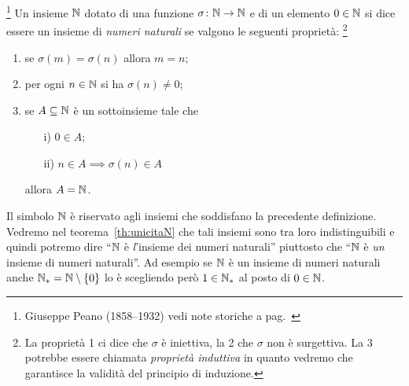 \begin{definition}%
  \footnote{Giuseppe Peano (1858--1932) vedi note storiche a pag.~\pageref{note:Peano}} 
    \label{def:naturali}%
  \index{$\NN$}%
  Un insieme $\NN$ dotato di una 
  funzione $\sigma\colon{\mathbb N}\to{\mathbb N}$ e di un elemento $0\in {\mathbb N}$ 
  si dice essere un insieme di 
  \emph{numeri naturali}%
%
 se valgono le seguenti proprietà:
  \footnote{La proprietà 1 ci dice che $\sigma$ è iniettiva,
  la 2 che $\sigma$ non è surgettiva. 
  La 3 potrebbe essere chiamata \emph{proprietà induttiva} 
  in quanto vedremo che garantisce la validità del principio di induzione.}
  \begin{enumerate}
  \item se $\sigma(m) =\sigma(n)$ allora $m=n$;
  \item per ogni $n\in {\mathbb N}$ si ha $\sigma(n)\neq 0$;
  \item se $A\subseteq {\mathbb N}$ è un sottoinsieme tale che 
  \begin{enumerate}
    \item[i)] $0\in A$;
    \item[ii)] $n\in A \implies \sigma(n)\in A$
  \end{enumerate}
  allora $A={\mathbb N}$.
\end{enumerate}
\end{definition}

Il simbolo $\NN$ è riservato agli insiemi che soddisfano la precedente definizione.
Vedremo nel teorema~\ref{th:unicitaN} che tali insiemi 
sono tra loro indistinguibili e quindi potremo dire 
``$\NN$ è \emph{l}'insieme dei numeri naturali''
piuttosto che ``$\NN$ è \emph{un} insieme di numeri naturali''.
Ad esempio se $\NN$ è un insieme di numeri naturali 
anche ${\mathbb N}_* = {\mathbb N}\setminus\{0\}$
lo è scegliendo però $1\in {\mathbb N}_*$ al posto di $0\in {\mathbb N}$.

